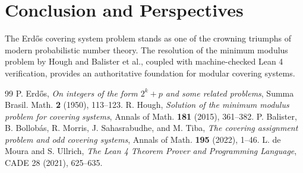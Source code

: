 \documentclass[11pt,a4paper]{article}
\theoremstyle{definition}
\begin{document}
\section{Conclusion and Perspectives}
The Erd\H{o}s covering system problem stands as one of the crowning triumphs of modern probabilistic number theory. The resolution of the minimum modulus problem by Hough and Balister et al., coupled with machine-checked Lean 4 verification, provides an authoritative foundation for modular covering systems.

\begin{thebibliography}{99}
 P. Erd\H{o}s, \textit{On integers of the form $2^k + p$ and some related problems}, Summa Brasil. Math. \textbf{2} (1950), 113--123.
 R. Hough, \textit{Solution of the minimum modulus problem for covering systems}, Annals of Math. \textbf{181} (2015), 361--382.
 P. Balister, B. Bollob\'as, R. Morris, J. Sahasrabudhe, and M. Tiba, \textit{The covering assignment problem and odd covering systems}, Annals of Math. \textbf{195} (2022), 1--46.
 L. de Moura and S. Ullrich, \textit{The Lean 4 Theorem Prover and Programming Language}, CADE 28 (2021), 625--635.
\end{thebibliography}
\end{document}
